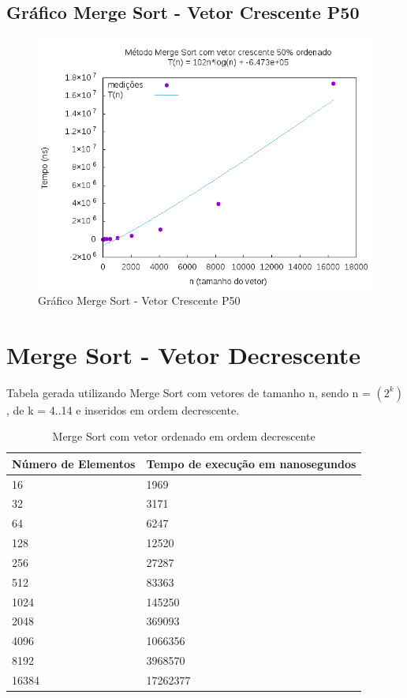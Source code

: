\documentclass[12pt,a4paper,twoside]{report}
\begin{document}
\subsection{Gráfico Merge Sort - Vetor Crescente P50}
\begin{figure}[H]
    \centering
    \includegraphics[width=0.7\linewidth]{graficos/MergeSort/vIntCrescenteP50/vIntCrescenteP50.png}
  \caption{Gráfico Merge Sort - Vetor Crescente P50}
\end{figure}

\section{Merge Sort - Vetor Decrescente}
Tabela gerada utilizando Merge Sort com vetores de tamanho n, sendo n = $(2^k)$, de k = 4..14 e inseridos em ordem decrescente.
\begin{table}[H]
\centering
\caption{Merge Sort com vetor ordenado em ordem decrescente}
\label{my-label}
\begin{tabular}{|l|l|}
\hline
\multicolumn{1}{|c|}{\textbf{Número de Elementos}} & \multicolumn{1}{c|}{\textbf{Tempo de execução em nanosegundos}} \\ \hline
16 & 1969 \\ \hline
32 & 3171 \\ \hline
64 & 6247 \\ \hline
128 & 12520 \\ \hline
256 & 27287 \\ \hline
512 & 83363 \\ \hline
1024 & 145250 \\ \hline
2048 & 369093 \\ \hline
4096 & 1066356 \\ \hline
8192 & 3968570 \\ \hline
16384 & 17262377 \\ \hline
\end{tabular}
\end{table}
\end{document}
